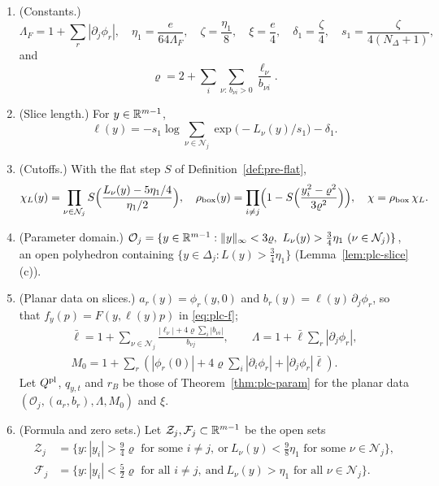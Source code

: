 \begin{definition}\label{def:plc-slice}
\begin{enumerate}[label=(\arabic*)]
\item (Constants.)
 \[
  \Lambda_F=1+\sum_r|\partial_j\phi_r|,\quad \eta_1=\frac e{64\Lambda_F},\quad \zeta=\frac{\eta_1}8,\quad
  \xi=\frac e4,\quad \delta_1=\frac\zeta4,\quad s_1=\frac\zeta{4(N_\Delta+1)},
 \]
 and
 \[
  \varrho=2+\sum_i\sum_{\nu:\,b_{\nu i}>0}\frac{\ell_\nu}{b_{\nu i}}.
 \]
\item (Slice length.) For $y\in\mathbb{R}^{m-1}$,
 \[
  \ell(y)=-s_1\log\sum_{\nu\in\mathcal N_j}\exp\bigl(-L_\nu(y)/s_1\bigr)-\delta_1 .
 \]
\item (Cutoffs.) With the flat step $S$ of Definition~\ref{def:pre-flat},
 \[
  \chi_L(y)=\prod_{\nu\in\mathcal N_j}S\Bigl(\frac{L_\nu(y)-5\eta_1/4}{\eta_1/2}\Bigr),\quad
  \rho_{\rm box}(y)=\prod_{i\ne j}\Bigl(1-S\Bigl(\frac{y_i^2-\varrho^2}{3\varrho^2}\Bigr)\Bigr),\quad
  \chi=\rho_{\rm box}\,\chi_L .
 \]
\item (Parameter domain.) $\mathcal O_j=\{y\in\R^{m-1}:\|y\|_\infty<3\varrho,\ L_\nu(y)>\frac34\eta_1\ (\nu\in\mathcal N_j)\}$, an open
 polyhedron containing $\{y\in\Delta_j:L(y)>\frac34\eta_1\}$ (Lemma~\ref{lem:plc-slice}(c)).
\item (Planar data on slices.) $a_r(y)=\phi_r(y,0)$ and $b_r(y)=\ell(y)\,\partial_j\phi_r$, so that $f_y(p)=F(y,\ell(y)p)$ in
 \eqref{eq:plc-f};
 \begin{gather*}
  \bar\ell=1+\sum_{\nu\in\mathcal N_j}
      \frac{|\ell_\nu|+4\varrho\sum_i|b_{\nu i}|}{b_{\nu j}},\qquad
  \Lambda=1+\bar\ell\sum_r|\partial_j\phi_r|,\\
  M_0=1+\sum_r\left(|\phi_r(0)|+4\varrho\sum_i|\partial_i\phi_r|
                              +|\partial_j\phi_r|\bar\ell\right).
 \end{gather*}
 Let $Q^{\rm pl}$, $q_{y,t}$ and $r_B$ be those of Theorem~\ref{thm:plc-param} for the planar data
 $(\mathcal O_j,(a_r,b_r),\Lambda,M_0)$ and $\xi$.
\item (Formula and zero sets.) Let $\mathcal Z_j,\mathcal F_j\subset\mathbb{R}^{m-1}$ be the open sets
 \begin{align*}
  \mathcal Z_j&=\bigl\{y:|y_i|>\tfrac94\varrho\text{ for some }i\ne j,\ \text{or}\ L_\nu(y)<\tfrac98\eta_1\text{ for some }\nu\in\mathcal N_j\bigr\},\\
  \mathcal F_j&=\bigl\{y:|y_i|<\tfrac52\varrho\text{ for all }i\ne j,\ \text{and}\ L_\nu(y)>\eta_1\text{ for all }\nu\in\mathcal N_j\bigr\}.

\end{align*}
\end{enumerate}
\end{definition}

